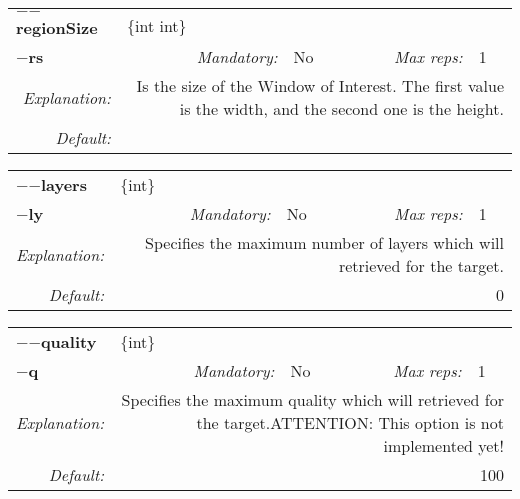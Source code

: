 \begin{center}\begin{tabular}{|rr|rl|rl|}
\hline
\multicolumn{2}{|l|}{\textbf{$-$$-$regionSize}} & \multicolumn{4}{|l|}{$\{$int int$\}$} \\
\cline{3-6}
\multicolumn{2}{|l|}{\textbf{$-$rs}} & \emph{Mandatory:} & No & \emph{Max reps:} & 1 \\
\hline
\emph{Explanation:} & \multicolumn{5}{|p{12cm}|}{Is the size of the Window of Interest. The first value is the width, and the second one is the height.} \\
\hline
\emph{Default:} & \multicolumn{5}{|p{12cm}|}{} \\
\hline
\end{tabular}\end{center}
\begin{center}\begin{tabular}{|rr|rl|rl|}
\hline
\multicolumn{2}{|l|}{\textbf{$-$$-$layers}} & \multicolumn{4}{|l|}{$\{$int$\}$} \\
\cline{3-6}
\multicolumn{2}{|l|}{\textbf{$-$ly}} & \emph{Mandatory:} & No & \emph{Max reps:} & 1 \\
\hline
\emph{Explanation:} & \multicolumn{5}{|p{12cm}|}{Specifies the maximum number of layers which will retrieved for the target.} \\
\hline
\emph{Default:} & \multicolumn{5}{|p{12cm}|}{0} \\
\hline
\end{tabular}\end{center}
\begin{center}\begin{tabular}{|rr|rl|rl|}
\hline
\multicolumn{2}{|l|}{\textbf{$-$$-$quality}} & \multicolumn{4}{|l|}{$\{$int$\}$} \\
\cline{3-6}
\multicolumn{2}{|l|}{\textbf{$-$q}} & \emph{Mandatory:} & No & \emph{Max reps:} & 1 \\
\hline
\emph{Explanation:} & \multicolumn{5}{|p{12cm}|}{Specifies the maximum quality which will retrieved for the target.\newline ATTENTION: This option is not implemented yet!} \\
\hline
\emph{Default:} & \multicolumn{5}{|p{12cm}|}{100} \\
\hline
\end{tabular}\end{center}
